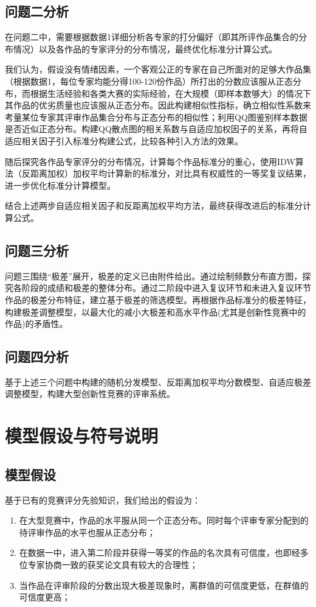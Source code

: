 \documentclass[bwprint]{gmcmthesis}
\begin{document}
\subsection{问题二分析}
\par
在问题二中，需要根据数据1详细分析各专家的打分偏好（即其所评作品集合的分布情况）以及各作品的专家评分的分布情况，最终优化标准分计算公式。
\par
我们认为，假设没有情绪因素，一个客观公正的专家在自己所面对的足够大作品集（根据数据1，每位专家均能分得100-120份作品）所打出的分数应该服从正态分布，而根据生活经验和各类大赛的实际经验，在大规模（即样本数够大）的情况下其作品的优劣质量也应该服从正态分布。因此构建相似性指标，确立相似性系数来考量某位专家其评审作品集合分布与正态分布的相似性；利用QQ图鉴别样本数据是否近似正态分布。构建QQ散点图的相关系数与自适应加权因子的关系，再将自适应相关因子引入标准分构建公式，比较各种引入方法的效果。
\par
随后探究各作品专家评分的分布情况，计算每个作品标准分的重心，使用IDW算法（反距离加权）加权平均计算新的标准分，对比具有权威性的一等奖复议结果，进一步优化标准分计算模型。
\par
结合上述两步自适应相关因子和反距离加权平均方法，最终获得改进后的标准分计算公式。

\subsection{问题三分析}
\par
问题三围绕“极差”展开，极差的定义已由附件给出。通过绘制频数分布直方图，探究各阶段的成绩和极差的整体分布。通过二阶段中进入复议环节和未进入复议环节作品的极差分布特征，建立基于极差的筛选模型。再根据作品标准分的极差特征，构建极差调整模型，以最大化的减小大极差和高水平作品(尤其是创新性竞赛中的作品)的矛盾性。

\subsection{问题四分析}
\par
基于上述三个问题中构建的随机分发模型、反距离加权平均分数模型、自适应极差调整模型，构建大型创新性竞赛的评审系统。

\section{模型假设与符号说明}

\subsection{模型假设}
基于已有的竞赛评分先验知识，我们给出的假设为：
\begin{enumerate}
	\item 在大型竞赛中，作品的水平服从同一个正态分布。同时每个评审专家分配到的待评审作品的水平也服从正态分布；
	\item 在数据一中，进入第二阶段并获得一等奖的作品的名次具有可信度，也即经多位专家协商一致的获奖论文具有较大的合理性；
	\item 当作品在评审阶段的分数出现大极差现象时，离群值的可信度更低，在群值的可信度更高；
\end{enumerate}
\end{document}
